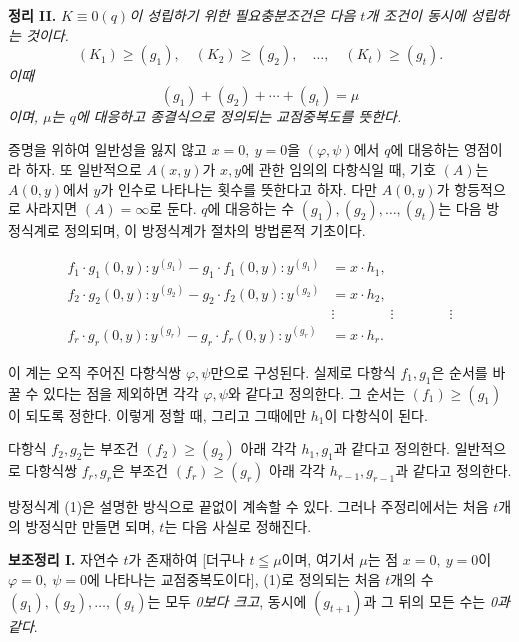 \textbf{정리 II.} \emph{\(K\equiv0(q)\)이 성립하기 위한 필요충분조건은 다음 \(t\)개 조건이 동시에 성립하는 것이다.}
\[
(K_1)\geq(g_1),\quad (K_2)\geq(g_2),\quad \ldots,\quad (K_t)\geq(g_t).
\]
\emph{이때}
\[
(g_1)+(g_2)+\cdots+(g_t)=\mu
\]
\emph{이며, \(\mu\)는 \(q\)에 대응하고 종결식으로 정의되는 교점중복도를 뜻한다.}

증명을 위하여 일반성을 잃지 않고 \(x=0,\ y=0\)을 \((\varphi,\psi)\)에서 \(q\)에 대응하는 영점이라 하자. 또 일반적으로 \(A(x,y)\)가 \(x,y\)에 관한 임의의 다항식일 때, 기호 \((A)\)는 \(A(0,y)\)에서 \(y\)가 인수로 나타나는 횟수를 뜻한다고 하자. 다만 \(A(0,y)\)가 항등적으로 사라지면 \((A)=\infty\)로 둔다. \(q\)에 대응하는 수 \((g_1),(g_2),\ldots,(g_t)\)는 다음 방정식계로 정의되며, 이 방정식계가 절차의 방법론적 기초이다.

\begin{equation}
\tag{1}
\begin{aligned}
f_1\cdot g_1(0,y):y^{(g_1)} - g_1\cdot f_1(0,y):y^{(g_1)} &= x\cdot h_1,\\
f_2\cdot g_2(0,y):y^{(g_2)} - g_2\cdot f_2(0,y):y^{(g_2)} &= x\cdot h_2,\\
&\vdots \qquad\qquad\vdots\qquad\qquad\vdots\\
f_r\cdot g_r(0,y):y^{(g_r)} - g_r\cdot f_r(0,y):y^{(g_r)} &= x\cdot h_r.
\end{aligned}
\end{equation}

이 계는 오직 주어진 다항식쌍 \(\varphi,\psi\)만으로 구성된다. 실제로 다항식 \(f_1,g_1\)은 순서를 바꿀 수 있다는 점을 제외하면 각각 \(\varphi,\psi\)와 같다고 정의한다. 그 순서는 \((f_1)\geq(g_1)\)이 되도록 정한다. 이렇게 정할 때, 그리고 그때에만 \(h_1\)이 다항식이 된다.

다항식 \(f_2,g_2\)는 부조건 \((f_2)\geq(g_2)\) 아래 각각 \(h_1,g_1\)과 같다고 정의한다. 일반적으로 다항식쌍 \(f_r,g_r\)은 부조건 \((f_r)\geq(g_r)\) 아래 각각 \(h_{r-1},g_{r-1}\)과 같다고 정의한다.

방정식계 (1)은 설명한 방식으로 끝없이 계속할 수 있다. 그러나 주정리에서는 처음 \(t\)개의 방정식만 만들면 되며, \(t\)는 다음 사실로 정해진다.

\textbf{보조정리 I.} 자연수 \(t\)가 존재하여 [더구나 \(t\leqq\mu\)이며, 여기서 \(\mu\)는 점 \(x=0,\ y=0\)이 \(\varphi=0,\ \psi=0\)에 나타나는 교점중복도이다], (1)로 정의되는 처음 \(t\)개의 수 \((g_1),(g_2),\ldots,(g_t)\)는 모두 \emph{0보다 크고}, 동시에 \((g_{t+1})\)과 그 뒤의 모든 수는 \emph{0과 같다}.

